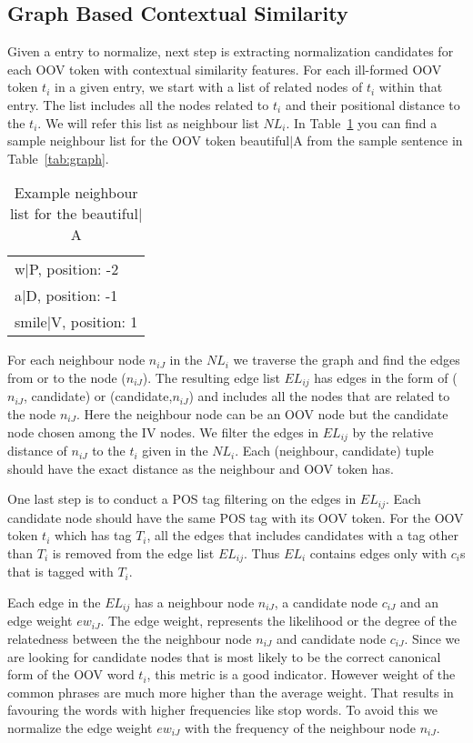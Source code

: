 \subsection{Graph Based Contextual Similarity}

Given a entry to normalize, next step is extracting normalization candidates for each OOV token with contextual similarity features. For each ill-formed OOV token $t_i$ in a given entry, we start with a list of related nodes of $t_i$ within that entry. The list includes all the nodes related to $t_i$ and their positional distance to the $t_i$. We will refer this list as neighbour list $NL_i$. In Table~\ref{tab:neigh} you can find a sample neighbour list for the OOV token beautiful$|$A from the sample sentence in Table~\ref{tab:graph}.

\begin{table}[hbt]
  \centering
  \begin{tabular}[tc]{l}
    w$|$P, position: -2 \\
    a$|$D, position: -1 \\
    smile$|$V, position: 1 \\
  \end{tabular}
\caption{Example neighbour list for the beautiful$|$A}
\label{tab:neigh}
\end{table}


For each neighbour node $n_{iJ}$ in the $NL_i$  we traverse the graph and find the edges from or to the node ($n_{iJ}$). The resulting edge list $EL_{ij}$ has edges in the form of ($n_{iJ}$, candidate) or (candidate,$n_{iJ}$) and includes all the nodes that are related to the node $n_{iJ}$. Here the neighbour node can be an OOV node but the candidate node chosen among the IV nodes. We filter the edges in $EL_{ij}$ by the relative distance of $n_{iJ}$ to the $t_i$ given in the $NL_i$. Each (neighbour, candidate) tuple should have the exact distance as the neighbour and OOV token has.

One last step is to conduct a POS tag filtering on the edges in $EL_{ij}$. Each candidate node should have the same POS tag with its OOV token. For the OOV token $t_i$ which has tag $T_i$, all the edges that includes candidates with a tag other than $T_i$ is removed from the edge list $EL_{ij}$. Thus $EL_{i}$ contains edges only with $c_{i}$s that is tagged with $T_i$.

Each edge in the $EL_{ij}$ has a neighbour node $n_{iJ}$, a candidate node $c_{iJ}$ and an edge weight $ew_{iJ}$. The edge weight, represents the likelihood or the degree of the relatedness between the the neighbour node $n_{iJ}$ and candidate node $c_{iJ}$. Since we are looking for candidate nodes that is most likely to be the correct canonical form of the OOV word $t_i$, this metric is a good indicator. However weight of the common phrases are much more higher than the average weight. That results in favouring the words with higher frequencies like stop words. To avoid this we normalize the edge weight $ew_{iJ}$ with the frequency of the neighbour node $n_{iJ}$.

